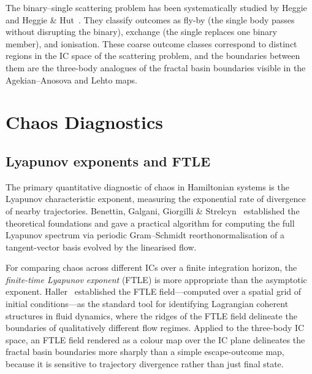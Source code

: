 \documentclass[11pt,a4paper]{article}
\begin{document}
The binary--single scattering problem has been systematically studied by Heggie~\cite{heggie1975}
and Heggie \& Hut~\cite{heggie2003}.  They classify outcomes as fly-by (the single body passes
without disrupting the binary), exchange (the single replaces one binary member), and
ionisation.  These coarse outcome classes correspond to distinct regions in the IC space of the
scattering problem, and the boundaries between them are the three-body analogues of the fractal
basin boundaries visible in the Agekian--Anosova and Lehto maps.

\section{Chaos Diagnostics}
\label{sec:chaos}

\subsection{Lyapunov exponents and FTLE}

The primary quantitative diagnostic of chaos in Hamiltonian systems is the Lyapunov
characteristic exponent, measuring the exponential rate of divergence of nearby trajectories.
Benettin, Galgani, Giorgilli \& Strelcyn~\cite{benettin1980} established the theoretical
foundations and gave a practical algorithm for computing the full Lyapunov spectrum via periodic
Gram--Schmidt reorthonormalisation of a tangent-vector basis evolved by the linearised flow.

For comparing chaos across different ICs over a finite integration horizon, the
\emph{finite-time Lyapunov exponent} (FTLE) is more appropriate than the asymptotic exponent.
Haller~\cite{haller2001} established the FTLE field---computed over a spatial grid of initial
conditions---as the standard tool for identifying Lagrangian coherent structures in fluid
dynamics, where the ridges of the FTLE field delineate the boundaries of qualitatively different
flow regimes.  Applied to the three-body IC space, an FTLE field rendered as a colour map over
the IC plane delineates the fractal basin boundaries more sharply than a simple escape-outcome
map, because it is sensitive to trajectory divergence rather than just final state.
\end{document}
